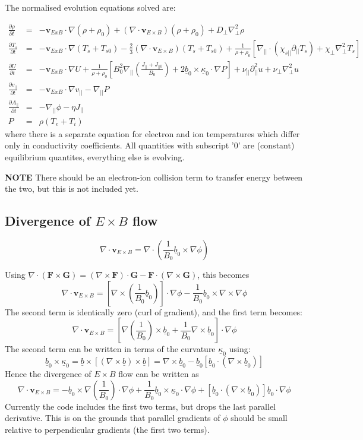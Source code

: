 \documentclass[12pt]{article}
\newcommand{\deriv}[2]{\ensuremath{\frac{\partial #1}{\partial #2}}}
\newcommand{\Vec}[1]{\ensuremath{\mathbf{#1}}}
\newcommand{\bvec}{\ensuremath{\underline{b}}}
\newcommand{\kvec}{\ensuremath{\underline{\kappa}}}
\newcommand{\apar}{\ensuremath{A_{||}}}
\begin{document}
The normalised evolution equations solved are:

\begin{eqnarray*}
  \deriv{\rho}{t} &=& -\Vec{v}_{ExB}\cdot\nabla\left(\rho + \rho_0\right) + \left(\nabla\cdot\Vec{v}_{E\times B}\right)\left(\rho + \rho_0\right) + D_\perp\nabla_\perp^2\rho \\
  \deriv{T_s}{t} &=& -\Vec{v}_{ExB}\cdot\nabla\left(T_s + T_{s0}\right) - \frac{2}{3}\left(\nabla\cdot\Vec{v}_{E\times B}\right)\left(T_s + T_{s0}\right) + \frac{1}{\rho + \rho_0}\left[ \nabla_{||}\cdot\left(\chi_{s||}\partial_{||}T_s\right) + \chi_\perp\nabla_\perp^2T_s\right] \\
  \deriv{U}{t} &=& -\Vec{v}_{ExB}\cdot\nabla U + \frac{1}{\rho+\rho_0}\left[ B_0^2\nabla_{||}\left(\frac{J_{||}+J_{||0}}{B_0}\right) + 2\bvec_0\times\kvec_0\cdot\nabla P\right] + \nu_{||}\partial_{||}^2u + \nu_\perp\nabla_\perp^2u \\
\deriv{v_{||}}{t} &=& -\Vec{v}_{ExB}\cdot\nabla v_{||} - \nabla_{||} P \\
\deriv{\apar}{t} &=& -\nabla_{||}\phi - \eta J_{||} \\
P &=& \rho\left(T_e + T_i\right)
\end{eqnarray*}
where there is a separate equation for electron and ion temperatures which
differ only in conductivity coefficients. All quantities with subscript '0'
are (constant) equilibrium quantites, everything else is evolving.

 {\bf NOTE} There should be an
electron-ion collision term to transfer energy between the two, but this
is not included yet.
 
\subsection{Divergence of $E\times B$ flow}

\[
\nabla\cdot\Vec{v}_{E\times B} = \nabla\cdot\left(\frac{1}{B_0}\bvec_0\times\nabla\phi\right)
\]

Using $\nabla\cdot\left(\Vec{F}\times\Vec{G}\right) = \left(\nabla\times\Vec{F}\right)\cdot\Vec{G} - \Vec{F}\cdot\left(\nabla\times\Vec{G}\right)$, this becomes
\[
\nabla\cdot\Vec{v}_{E\times B} = \left[\nabla\times\left(\frac{1}{B_0}\bvec_0\right)\right]\cdot\nabla\phi - \frac{1}{B_0}\bvec_0\times\nabla\times\nabla\phi
\]
The second term is identically zero (curl of gradient), and the first term becomes:
\[
\nabla\cdot\Vec{v}_{E\times B} = \left[\nabla\left(\frac{1}{B_0}\right)\times\bvec_0 + \frac{1}{B_0}\nabla\times\bvec_0\right]\cdot\nabla\phi
\]
The second term can be written in terms of the curvature $\kvec_0$ using:
\[
\bvec_0\times\kvec_0 = \bvec\times\left[\left(\nabla\times\bvec\right)\times\bvec\right] = \nabla\times\bvec_0 - \bvec_0\left[\bvec_0\cdot\left(\nabla\times\bvec_0\right)\right]
\]
Hence the divergence of $E\times B$ flow can be written as
\[
\nabla\cdot\Vec{v}_{E\times B} = -\bvec_0\times\nabla\left(\frac{1}{B_0}\right)\cdot\nabla\phi + \frac{1}{B_0}\bvec_0\times\kvec_0\cdot\nabla\phi + \left[\bvec_0\cdot\left(\nabla\times\bvec_0\right)\right]\bvec_0\cdot\nabla\phi
\]
Currently the code includes the first two terms, but drops the last parallel
derivative. This is on the grounds that parallel gradients of $\phi$ should
be small relative to perpendicular gradients (the first two terms).
\end{document}
